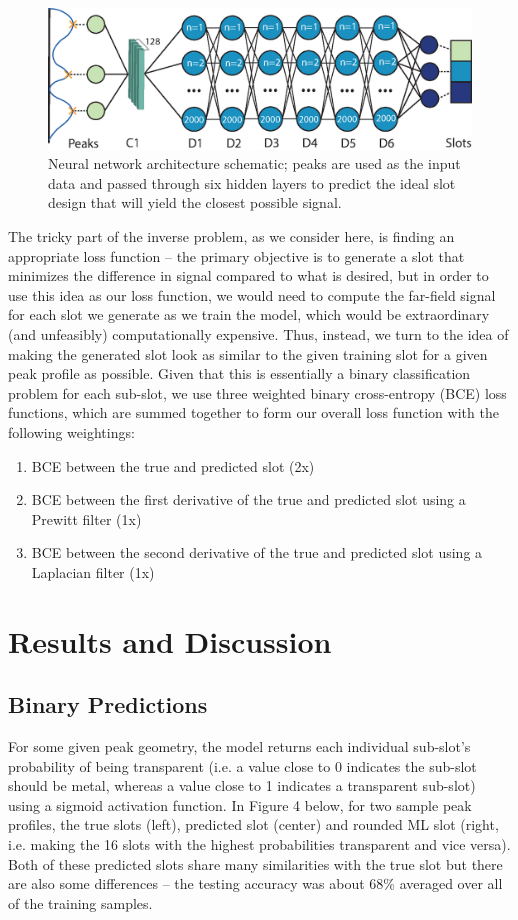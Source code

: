 \documentclass[11pt]{article}
\begin{document}
\begin{figure}[b]
	\centering
	\includegraphics[width=6in]{figures/fig1.eps}
	\caption{Neural network architecture schematic; peaks are used as the input data and passed through six hidden layers to predict the ideal slot design that will yield the closest possible signal.}
\end{figure}

\noindent The tricky part of the inverse problem, as we consider here, is finding an appropriate loss function -- the primary objective is to generate a slot that minimizes the difference in signal compared to what is desired, but in order to use this idea as our loss function, we would need to compute the far-field signal for each slot we generate as we train the model, which would be extraordinary (and unfeasibly) computationally expensive. Thus, instead, we turn to the idea of making the generated slot look as similar to the given training slot for a given peak profile as possible. Given that this is essentially a binary classification problem for each sub-slot, we use three weighted binary cross-entropy (BCE) loss functions, which are summed together to form our overall loss function with the following weightings:
\begin{enumerate}
  \item BCE between the true and predicted slot (2x)
  \item BCE between the first derivative of the true and predicted slot using a Prewitt filter (1x)
  \item BCE between the second derivative of the true and predicted slot using a Laplacian filter (1x)
\end{enumerate}

\section*{Results and Discussion}
\subsection*{Binary Predictions}
For some given peak geometry, the model returns each individual sub-slot's probability of being transparent (i.e. a value close to 0 indicates the sub-slot should be metal, whereas a value close to 1 indicates a transparent sub-slot) using a sigmoid activation function. In Figure 4 below, for two sample peak profiles, the true slots (left), predicted slot (center) and rounded ML slot (right, i.e. making the 16 slots with the highest probabilities transparent and vice versa). Both of these predicted slots share many similarities with the true slot but there are also some differences -- the testing accuracy was about 68\% averaged over all of the training samples. 
\end{document}
